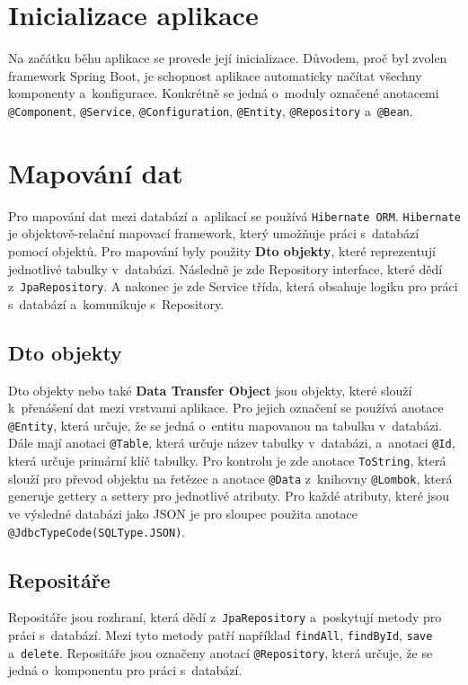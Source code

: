 \section{Inicializace aplikace}
Na začátku běhu aplikace se provede její inicializace.  
Důvodem, proč byl zvolen framework Spring Boot, je schopnost aplikace automaticky 
načítat všechny komponenty a~konfigurace.  
Konkrétně se jedná o~moduly označené anotacemi \texttt{@Component}, \texttt{@Service}, 
\texttt{@Configuration}, \texttt{@Entity}, \texttt{@Repository} a~\texttt{@Bean}.

\section{Mapování dat}
\label{sec:mapovaniDat}
Pro mapování dat mezi databází a~aplikací se používá \texttt{Hibernate ORM}.
\texttt{Hibernate} je objektově-relační mapovací framework, který umožňuje práci s~databází pomocí objektů.
Pro mapování byly použity \textbf{Dto objekty}, které reprezentují jednotlivé tabulky v~databázi.
Následně je zde Repository interface, které dědí z~\texttt{JpaRepository}.
A nakonec je zde Service třída, která obsahuje logiku pro práci s~databází a~komunikuje s~Repository.

\subsection{Dto objekty}
Dto objekty nebo také \textbf{Data Transfer Object} jsou objekty, které slouží k~přenášení dat mezi vrstvami aplikace.
Pro jejich označení se používá anotace \texttt{@Entity}, která určuje, že se jedná o~entitu mapovanou na tabulku v~databázi.
Dále mají anotaci \texttt{@Table}, která určuje název tabulky v~databázi, a~anotaci \texttt{@Id}, která určuje primární klíč tabulky.
Pro kontrolu je zde anotace \texttt{ToString}, která slouží pro převod objektu na řetězec a anotace \texttt{@Data} 
z~knihovny \texttt{@Lombok}, která generuje gettery a settery pro jednotlivé atributy.
Pro každé atributy, které jsou ve výsledné databázi jako JSON je pro sloupec použita anotace \texttt{@JdbcTypeCode(SQLType.JSON)}.


\subsection{Repositáře}
Repositáře jsou rozhraní, která dědí z~\texttt{JpaRepository} a~poskytují metody pro práci s~databází.
Mezi tyto metody patří například \texttt{findAll}, \texttt{findById}, \texttt{save} a~\texttt{delete}.
Repositáře jsou označeny anotací \texttt{@Repository}, která určuje, že se jedná o~komponentu pro práci s~databází.

